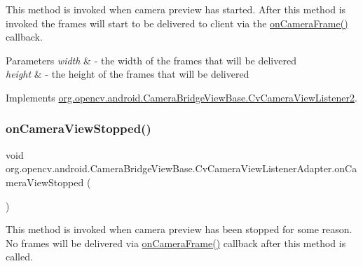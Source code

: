 This method is invoked when camera preview has started. After this method is invoked the frames will start to be delivered to client via the \mbox{\hyperlink{classorg_1_1opencv_1_1android_1_1_camera_bridge_view_base_1_1_cv_camera_view_listener_adapter_a8e7517c94e210a4bd3176ae681babc4b}{on\+Camera\+Frame()}} callback. 
\begin{DoxyParams}{Parameters}
{\em width} & -\/ the width of the frames that will be delivered \\
\hline
{\em height} & -\/ the height of the frames that will be delivered \\
\hline
\end{DoxyParams}


Implements \mbox{\hyperlink{interfaceorg_1_1opencv_1_1android_1_1_camera_bridge_view_base_1_1_cv_camera_view_listener2_a8229eca0048f11f06e2cd798c10a1b4d}{org.\+opencv.\+android.\+Camera\+Bridge\+View\+Base.\+Cv\+Camera\+View\+Listener2}}.

\mbox{\label{classorg_1_1opencv_1_1android_1_1_camera_bridge_view_base_1_1_cv_camera_view_listener_adapter_aadb52c2d31eddad60a8d5295f66fe76e}} 
\subsubsection{\texorpdfstring{on\+Camera\+View\+Stopped()}{onCameraViewStopped()}}
{\footnotesize\ttfamily void org.\+opencv.\+android.\+Camera\+Bridge\+View\+Base.\+Cv\+Camera\+View\+Listener\+Adapter.\+on\+Camera\+View\+Stopped (\begin{DoxyParamCaption}{ }\end{DoxyParamCaption})}

This method is invoked when camera preview has been stopped for some reason. No frames will be delivered via \mbox{\hyperlink{classorg_1_1opencv_1_1android_1_1_camera_bridge_view_base_1_1_cv_camera_view_listener_adapter_a8e7517c94e210a4bd3176ae681babc4b}{on\+Camera\+Frame()}} callback after this method is called. 

